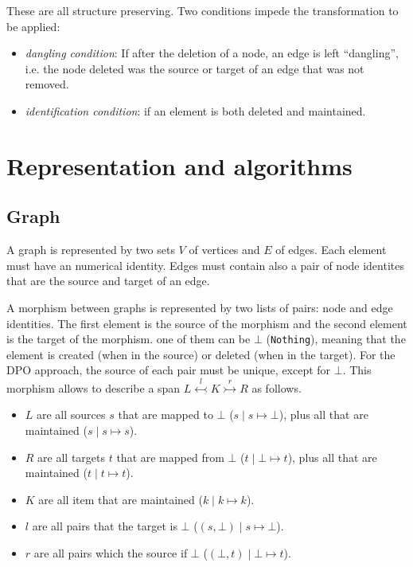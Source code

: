 \documentclass[a4paper]{report}
\begin{document}
These are all structure preserving. Two conditions impede the transformation to be applied:
\begin{itemize}
	\item \textit{dangling condition}: If after the deletion of a node, an edge is left ``dangling'', i.e. the node deleted was the source or target of an edge that was not removed.
	\item \textit{identification condition}: if an element is both deleted and maintained.
\end{itemize}

\chapter{Representation and algorithms}
\section{Graph}
A graph is represented by two sets $V$ of vertices and $E$ of edges. Each element must have an numerical identity. Edges must contain also a pair of node identites that are the source and target of an edge.

A morphism between graphs is represented by two lists of pairs: node and edge identities. The first element is the source of the morphism and the second element is the target of the morphism. one of them can be $\bot$ (\texttt{Nothing}), meaning that the element is created (when in the source) or deleted (when in the target). For the DPO approach, the source of each pair must be unique, except for $\bot$. This morphism allows to describe a span $L \overset{l}{\leftarrowtail} K \overset{r}{\rightarrowtail} R$ as follows.
\begin{itemize}
	\item $L$ are all sources $s$ that are mapped to $\bot$ ($s \mid s \mapsto \bot$), plus all that are maintained ($s \mid s \mapsto s$).
	\item $R$ are all targets $t$ that are mapped from $\bot$ ($t \mid \bot \mapsto t$), plus all that are maintained ($t \mid t \mapsto t$).
	\item $K$ are all item that are maintained ($k \mid k \mapsto k$).
	\item $l$ are all pairs that the target is $\bot$ ($(s, \bot) \mid s \mapsto \bot$).
	\item $r$ are all pairs which the source if $\bot$ ($(\bot, t) \mid \bot \mapsto t$).
\end{itemize}
\end{document}
